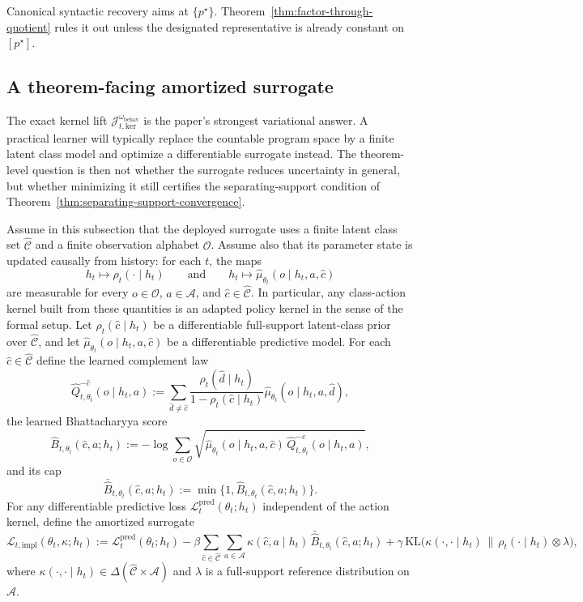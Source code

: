 \documentclass[11pt]{article}
\theoremstyle{definition}
\theoremstyle{remark}
\newcommand{\Acal}{\mathcal{A}}
\newcommand{\Ccal}{\mathcal{C}}
\newcommand{\Ocal}{\mathcal{O}}
\newcommand{\KL}{\mathrm{KL}}
\begin{document}
Canonical syntactic recovery aims at $\{p^\star\}$. Theorem~\ref{thm:factor-through-quotient} rules it out unless the designated representative is already constant on $[p^\star]$.

\subsection{A theorem-facing amortized surrogate}
\label{sec:amortized-surrogate}

The exact kernel lift $\mathcal J_{t,\mathrm{ker}}^{\omega_{\mathrm{behav}}}$ is the paper's strongest variational answer. A practical learner will typically replace the countable program space by a finite latent class model and optimize a differentiable surrogate instead. The theorem-level question is then not whether the surrogate reduces uncertainty in general, but whether minimizing it still certifies the separating-support condition of Theorem~\ref{thm:separating-support-convergence}.

Assume in this subsection that the deployed surrogate uses a finite latent class set $\widehat{\Ccal}$ and a finite observation alphabet $\Ocal$. Assume also that its parameter state is updated causally from history: for each $t$, the maps
\[
h_t\longmapsto \rho_t(\cdot\mid h_t)
\qquad\text{and}\qquad
h_t\longmapsto \widehat\mu_{\theta_t}(o\mid h_t,a,\hat c)
\]
are measurable for every $o\in\Ocal$, $a\in\Acal$, and $\hat c\in\widehat{\Ccal}$. In particular, any class-action kernel built from these quantities is an adapted policy kernel in the sense of the formal setup. Let $\rho_t(\hat c\mid h_t)$ be a differentiable full-support latent-class prior over $\widehat{\Ccal}$, and let $\widehat\mu_{\theta_t}(o\mid h_t,a,\hat c)$ be a differentiable predictive model. For each $\hat c\in\widehat{\Ccal}$ define the learned complement law
\[
\widehat Q_{t,\theta_t}^{-\hat c}(o\mid h_t,a)
:=
\sum_{\hat d\neq \hat c}
\frac{\rho_t(\hat d\mid h_t)}{1-\rho_t(\hat c\mid h_t)}
\widehat\mu_{\theta_t}(o\mid h_t,a,\hat d),
\]
the learned Bhattacharyya score
\[
\widehat B_{t,\theta_t}(\hat c,a;h_t)
:=
-\log\sum_{o\in\Ocal}
\sqrt{
\widehat\mu_{\theta_t}(o\mid h_t,a,\hat c)\,
\widehat Q_{t,\theta_t}^{-\hat c}(o\mid h_t,a)},
\]
and its cap
\[
\bar{\widehat B}_{t,\theta_t}(\hat c,a;h_t)
:=
\min\{1,\widehat B_{t,\theta_t}(\hat c,a;h_t)\}.
\]
For any differentiable predictive loss $\mathcal L_t^{\mathrm{pred}}(\theta_t;h_t)$ independent of the action kernel, define the amortized surrogate
\[
\mathcal L_{t,\mathrm{impl}}(\theta_t,\kappa;h_t)
:=
\mathcal L_t^{\mathrm{pred}}(\theta_t;h_t)
-\beta
\sum_{\hat c\in\widehat{\Ccal}}\sum_{a\in\Acal}
\kappa(\hat c,a\mid h_t)\,\bar{\widehat B}_{t,\theta_t}(\hat c,a;h_t)
+\gamma\,
\KL\!\bigl(\kappa(\cdot,\cdot\mid h_t)\,\|\,\rho_t(\cdot\mid h_t)\otimes\lambda\bigr),
\]
where $\kappa(\cdot,\cdot\mid h_t)\in\Delta(\widehat{\Ccal}\times\Acal)$ and $\lambda$ is a full-support reference distribution on $\Acal$.
\end{document}
